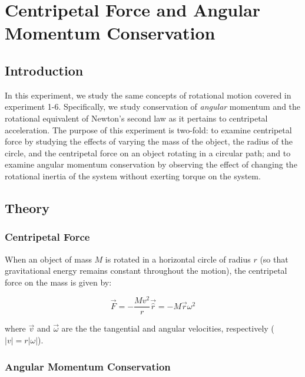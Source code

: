 \chapter{Centripetal Force and Angular Momentum Conservation}
\label{chap:centripetal}
\section{Introduction}
In this experiment, we study the same concepts of rotational motion covered in experiment 1-6. Specifically, we study conservation of {\it{angular}} momentum and the rotational equivalent of Newton's second law as it pertains to centripetal acceleration. The purpose of this experiment is two-fold: to examine centripetal force by studying the effects of varying the mass of the object, the radius of the circle, and the centripetal force on an object rotating in a circular path; and to examine angular momentum conservation by observing the effect of changing the rotational inertia of the system without exerting torque on the system.

\section{Theory}
\subsection{Centripetal Force}
When an object of mass $M$ is rotated in a horizontal circle of radius $r$ (so that gravitational energy remains constant throughout the motion), the centripetal force on the mass is given by:

\begin{equation}
\vec F = - \frac{M v^{2}}{r} \vec {\hat r} =- M \vec r \omega ^2
\end{equation}

\noindent where $\vec v$ and $\vec \omega$ are the the tangential and angular velocities, respectively ($|v| = r |\omega|$).

\subsection{Angular Momentum Conservation}

